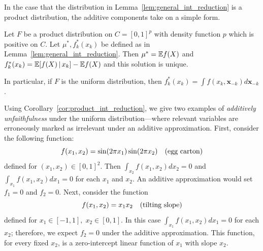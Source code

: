 In the case that the distribution in
Lemma~\ref{lem:general_int_reduction} is a product distribution, 
the additive components take on a simple form.

\begin{corollary}
\label{cor:product_int_reduction}
Let $F$ be a product distribution on $C=[0,1]^p$ with density function
$p$ which is positive on $C$. 
Let $\mu^*, f^*_k(x_k)$ be defined as in Lemma~\ref{lem:general_int_reduction}.
Then $\mu^* = {\mathbb E} f(X)$ and $f^*_k(x_k) = {\mathbb E}[ f(X) {\,|\,} x_k] - {\mathbb E} f(X)$ and this solution is unique.
\end{corollary}

In particular, if $F$ is the uniform distribution,
then $f^*_k(x_k) = \displaystyle\int f(x_k, \mathbf{x}_{-k})
d\mathbf{x}_{-k}$.

\begin{example} Using Corollary~\ref{cor:product_int_reduction}, we
  give two examples of \emph{additively unfaithfulness} under the
  uniform distribution---where relevant variables are
  erroneously marked as irrelevant under an additive
  approximation. First, consider the following function:
\begin{equation}
f(x_1, x_2) = \sin( 2\pi x_1) \sin( 2 \pi x_2)\quad
\textrm{(egg carton)} 
\end{equation}
defined for $(x_1, x_2) \in [0,1]^2$.  Then
$\displaystyle\int_{x_2} f(x_1, x_2) d x_2 = 0$ and
$\displaystyle\int_{x_1} f(x_1, x_2) d x_1 = 0$ for each $x_1$ and $x_2$. An additive approximation
would set $f_1 = 0$ and $f_2 = 0$.  Next, consider the function
\begin{equation}
f(x_1, x_2) = x_1 x_2 \quad \textrm{(tilting slope)} 
\end{equation}
defined for $x_1 \in [-1,1],\; x_2 \in [0,1]$.  In this case
$\displaystyle\int_{x_1} f(x_1, x_2) d x_1 = 0$ for each $x_2$; therefore, we expect $f_2 = 0$ under the additive approximation. This function, for every fixed $x_2$, is a zero-intercept linear function of $x_1$ with slope $x_2$.
\end{example}

